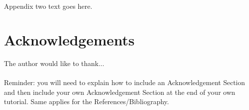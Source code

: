 \documentclass[12pt,journal,compsoc]{IEEEtran}
\begin{document}
\section{}
Appendix two text goes here.


\section*{Acknowledgements}

The author would like to thank...\\ \\

Reminder: you will need to explain how to include an Acknowledgement Section and then include your own Acknowledgement Section at the end of your own tutorial. Same applies for the References/Bibliography.






 
\end{document}
